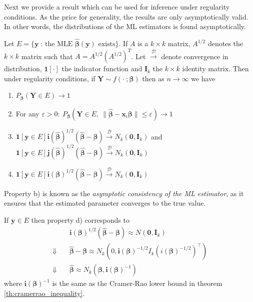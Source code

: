 Next we provide a result which can be used for inference under regularity conditions. 
As the price for generality, the results are only asymptotically valid. 
In other words, the distributions of the ML estimators is found asymptotically. 

\begin{theorem}\label{th:distribution_ml_estimator}
Let $E = \{\mathbf{y} \ : \ \text{the MLE } \hat{\boldsymbol{\beta}}(\mathbf{y}) \text{ exists}\}$. 
If $A$ is a $k \times k$ matrix, $A^{1/2}$ denotes the $k \times k$ matrix such that $A = A^{1/2}\left( A^{1/2} \right)^T$.
Let $\xrightarrow{\mathcal{D}}$ denote convergence in distribution, $\mathbf{1}[\cdot]$ the indicator function and $\textbf{I}_k$ the $k \times k$ identity matrix.
Then under regularity conditions, if $\mathbf{Y} \sim f(\cdot \ ;\boldsymbol{\beta})$ then as $n \rightarrow \infty$ we have 
\begin{enumerate}[label=(\alph*)]
    \item $P_{\boldsymbol{\beta}}(\textbf{Y} \in E) \rightarrow 1$
    \item For any $\varepsilon > 0: \ P_{\boldsymbol{\beta}}(\textbf{Y} \in E, \ \|\hat{\boldsymbol{\beta}} - \textbf{x}_i\boldsymbol{\beta}\| \leq \varepsilon) \rightarrow 1$
    \item $\mathbf{1}[\mathbf{y} \in E] \textbf{i}(\hat{\boldsymbol{\beta}})^{1/2}(\hat{\boldsymbol{\beta}} - \boldsymbol{\beta}) \xrightarrow{\mathcal{D}} N_k(\textbf{0}, \textbf{I}_k)$ and $\textbf{1}[\mathbf{y} \in E] \textbf{j}(\hat{\boldsymbol{\beta}})^{1/2}(\hat{\boldsymbol{\beta}} - \boldsymbol{\beta}) \xrightarrow{\mathcal{D}} N_k(\textbf{0}, \textbf{I}_k)$
    \item $\textbf{1}[\mathbf{y} \in E] \textbf{i}(\boldsymbol{\beta})^{1/2}(\hat{\boldsymbol{\beta}} - \boldsymbol{\beta}) \xrightarrow{\mathcal{D}} N_k(\textbf{0}, \textbf{I}_k)$
\end{enumerate}
\end{theorem}

Property b) is known as the \textit{asymptotic consistency of the ML estimator}, as it ensures that the estimated parameter converges to the true value.

If $\textbf{y}\in E$ then property d) corresponds to
\begin{align*}
    & \textbf{i}(\boldsymbol{\beta})^{1/2} (\hat{\boldsymbol{\beta}}-\boldsymbol{\beta}) \approx N(\textbf{0},\textbf{I}_k) \\
    \Downarrow \quad & \hat{\boldsymbol{\beta}}-\boldsymbol{\beta} \approx N_k(0,\textbf{i}(\boldsymbol{\beta})^{-1/2} I_k (i(\boldsymbol{\beta})^{-1/2})^\top) \\
    \Downarrow \quad & \hat{\boldsymbol{\beta}} \approx N_k(\boldsymbol{\beta}, \textbf{i}(\boldsymbol{\beta})^{-1})
\end{align*}
where $\textbf{i}(\boldsymbol{\beta})^{-1}$ is the same as the Cramer-Rao lower bound in theorem \ref{th:cramerrao_inequality}.

